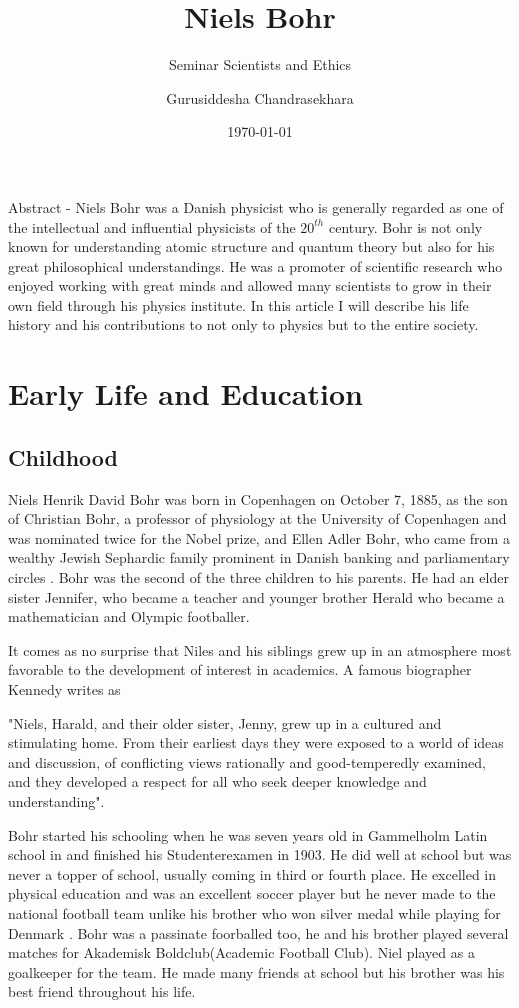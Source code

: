 \documentclass[11pt, article]{scrartcl}
\title{Niels Bohr}
\subtitle{Seminar Scientists and Ethics}
\author{Gurusiddesha Chandrasekhara}
\date{\today}
\begin{document}
\maketitle
Abstract - Niels Bohr was a Danish physicist who is generally regarded as one of the
intellectual and influential physicists of the $20^{th}$ century. Bohr is not only known for
understanding atomic structure and quantum theory but also for his great philosophical understandings.
He was a promoter of scientific research who enjoyed working with great minds and allowed many
scientists to grow in their own field through his physics institute. In this article 
I will describe his life history and his contributions to not only to physics but to 
the entire society.

\tableofcontents
\newpage

\section{Early Life and Education} %

\subsection{Childhood}
Niels Henrik David Bohr was born in Copenhagen on October 7, 1885, as the son of Christian
Bohr, a professor of physiology at the University of Copenhagen and was nominated twice for 
the Nobel prize\cite{father}, and Ellen Adler Bohr, who came from a wealthy Jewish Sephardic family prominent in Danish banking and parliamentary circles \cite{mother}.
Bohr was the second of the three children to his parents. He had an elder sister Jennifer,
 who became a teacher and younger brother Herald who became a mathematician and Olympic footballer\cite{brother}.

It comes as no surprise that Niles and his siblings grew up in an atmosphere most
favorable to the development of interest in academics. A famous biographer Kennedy writes as\cite{kennedy}

"Niels, Harald, and their older sister, Jenny, grew up
in a cultured and stimulating home. From their earliest days they were exposed to a world of
ideas and discussion, of conflicting views rationally and good-temperedly examined, and they
developed a respect for all who seek deeper knowledge and understanding".

Bohr started his schooling when he was seven years old in Gammelholm Latin school in and finished his Studenterexamen in 1903\cite{kennedy}.
He did well at school but was never a topper of school, usually coming in third or fourth place. He excelled in physical education and was an excellent soccer player but he never made to the national football team unlike his brother who won silver medal while playing for Denmark \cite{brother}.
Bohr was a passinate foorballed too, he and his brother played several matches for
Akademisk Boldclub(Academic Football Club). Niel played as a goalkeeper for the team.
He made many friends at school but his brother was his best friend throughout his life. 
\end{document}
